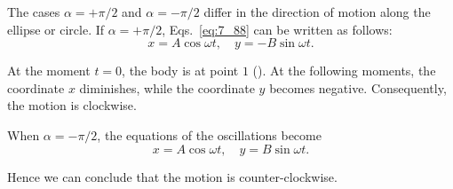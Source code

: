 \begin{enumerate}[1.]
	The cases $\alpha=+\pi/2$ and $\alpha=-\pi/2$ differ in the direction of motion along the ellipse or circle. If $\alpha=+\pi/2$, Eqs.~\eqref{eq:7_88} can be written as follows:
	\begin{equation}\label{eq:7_95}
		x = A\cos\omega t,\quad y = -B\sin\omega t.
	\end{equation}

	\noindent
	At the moment $t=0$, the body is at point $1$ (). At the following moments, the coordinate $x$ diminishes, while the coordinate $y$ becomes negative. Consequently, the motion is clockwise.

	When $\alpha=-\pi/2$, the equations of the oscillations become
	\begin{equation}\label{eq:7_96}
		x = A\cos\omega t,\quad y = B\sin\omega t.
	\end{equation}

	\noindent
	Hence we can conclude that the motion is counter-clockwise.
\end{enumerate}

